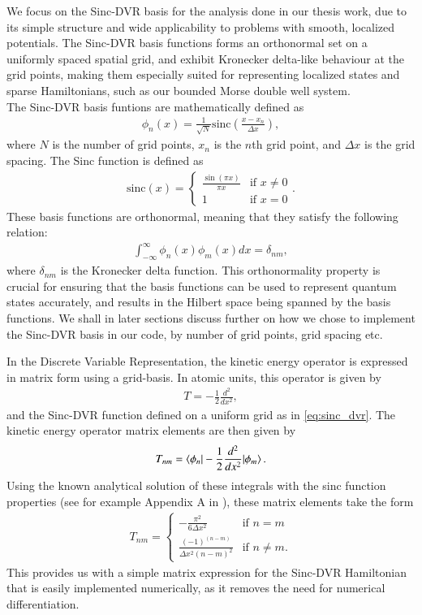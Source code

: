 \documentclass{subfiles}
\begin{document}
We focus on the Sinc-DVR basis \cite{colbert1992novel} for the analysis done in our thesis work, due to its simple structure and wide applicability to problems with smooth, localized potentials. The Sinc-DVR basis functions forms an orthonormal set on a uniformly spaced spatial grid, and exhibit Kronecker delta-like behaviour at the grid points, making them especially suited for representing localized states and sparse Hamiltonians, such as our bounded Morse double well system.
\\ The Sinc-DVR basis funtions are mathematically defined as
\begin{align*}
    \phi_n(x) = \frac{1}{\sqrt{N}} \text{sinc}\left(\frac{x - x_n}{\Delta x}\right)\label{eq:sinc_dvr},
\end{align*}
where $N$ is the number of grid points, $x_n$ is the $n$th grid point, and $\Delta x$ is the grid spacing. The Sinc function is defined as
\begin{align*}
    \text{sinc}(x) = \begin{cases}
        \frac{\sin(\pi x)}{\pi x} & \text{if } x \neq 0 \\
        1 & \text{if } x = 0
    \end{cases}.
\end{align*}
These basis functions are orthonormal, meaning that they satisfy the following relation:
\begin{align*}
    \int_{-\infty}^{\infty} \phi_n(x) \phi_m(x) dx = \delta_{nm},
\end{align*}
where $\delta_{nm}$ is the Kronecker delta function. This orthonormality property is crucial for ensuring that the basis functions can be used to represent quantum states accurately, and results in the Hilbert space being spanned by the basis functions. We shall in later sections discuss further on how we chose to implement the Sinc-DVR basis in our code, by number of grid points, grid spacing etc. 

In the Discrete Variable Representation, the kinetic energy operator is expressed in matrix form using a grid-basis. In atomic units, this operator is given by
\begin{align*}
    T = -\frac{1}{2} \frac{d^2}{dx^2} ,
\end{align*}
and the Sinc-DVR function defined on a uniform grid as in \eqref{eq:sinc_dvr}. The kinetic energy operator matrix elements are then given by
\begin{align*}
    T_{nm} = \braket{\phi_n|-\frac{1}{2} \frac{d^2}{dx^2}|\phi_m}.
\end{align*}
Using the known analytical solution of these integrals with the sinc function properties (see for example Appendix A in \cite{colbert1992novel}), these matrix elements take the form 
\begin{align*}
    T_{nm} = \begin{cases}
        -\frac{\pi^2}{6\Delta x^2} & \text{if } n = m \\
        \frac{(-1)^(n-m)}{\Delta x^2(n - m)^2} & \text{if } n \neq m.
    \end{cases}
\end{align*}
This provides us with a simple matrix expression for the Sinc-DVR Hamiltonian that is easily implemented numerically, as it removes the need for numerical differentiation.
\end{document}

